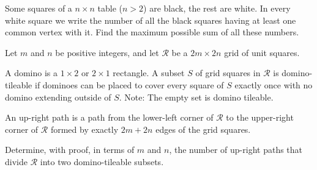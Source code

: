 \begin{problem}[IZhO 2020]
    Some squares of a $n \times n$ table ($n>2$) are black, the rest are white. In every white square we write the number of all the black squares having at least one common vertex with it. Find the maximum possible sum of all these numbers.
\end{problem}

\begin{problem}[USAJMO 2025]
    Let $m$ and $n$ be positive integers, and let $\mathcal R$ be a $2m\times{2n}$ grid of unit squares.

    A domino is a $1\times2$ or $2\times1$ rectangle. A subset $S$ of grid squares in $\mathcal R$ is domino-tileable if dominoes can be placed to cover every square of $S$ exactly once with no domino extending outside of $S$. Note: The empty set is domino tileable.

    An up-right path is a path from the lower-left corner of $\mathcal R$ to the upper-right corner of $\mathcal R$ formed by exactly $2m+2n$ edges of the grid squares.

    Determine, with proof, in terms of $m$ and $n$, the number of up-right paths that divide $\mathcal R$ into two domino-tileable subsets.
\end{problem}

